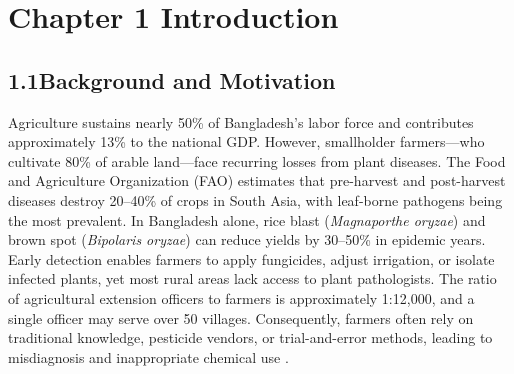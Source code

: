 \documentclass[12pt,letterpaper]{report}
\begin{document}
\clearpage
{}
{}
{
\renewcommand{\listfigurename}{\centering\fontsize{18}{22}\selectfont\bfseries LIST OF FIGURES}
\setlength{\parskip}{0pt}
\listoffigures
}

\clearpage
{}
{}
{
\renewcommand{\listtablename}{\centering\fontsize{18}{22}\selectfont\bfseries LIST OF TABLES}
\setlength{\parskip}{0pt}
\listoftables
}

\clearpage
{}

\chapter*{Chapter 1 Introduction}

\section*{1.1\hspace{12pt}Background and Motivation}

Agriculture sustains nearly 50\% of Bangladesh's labor force and contributes approximately 13\% to the national GDP. However, smallholder farmers—who cultivate 80\% of arable land—face recurring losses from plant diseases. The Food and Agriculture Organization (FAO) estimates that pre-harvest and post-harvest diseases destroy 20–40\% of crops in South Asia, with leaf-borne pathogens being the most prevalent. In Bangladesh alone, rice blast (\textit{Magnaporthe oryzae}) and brown spot (\textit{Bipolaris oryzae}) can reduce yields by 30–50\% in epidemic years. Early detection enables farmers to apply fungicides, adjust irrigation, or isolate infected plants, yet most rural areas lack access to plant pathologists. The ratio of agricultural extension officers to farmers is approximately 1:12,000, and a single officer may serve over 50 villages. Consequently, farmers often rely on traditional knowledge, pesticide vendors, or trial-and-error methods, leading to misdiagnosis and inappropriate chemical use \cite{ref13}.
\end{document}
